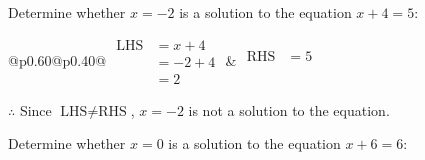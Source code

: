 \documentclass[12pt]{article}
\newcounter{minipagecount}
\begin{document}
\begin{multicols}{2}
\begin{minipage}[t]{0.40\textwidth}
    \noindent Determine whether \(x = -2\) is a solution to the equation \(x + 4 = 5\):
    \vspace{2pt}  %

    \noindent
    \renewcommand{\arraystretch}{1.3} %
    \begin{tabular}{@{}p{0.60\linewidth}@{}p{0.40\linewidth}@{}}
        \(\begin{aligned}
            \text{LHS} &= x + 4 \\
                    &= -2 + 4 \\
                    &= 2 
        \end{aligned}\) &
        \(\begin{aligned}
            \text{RHS} &= 5\\
                    & \\
                    &
        \end{aligned}\)
    \end{tabular}
    \renewcommand{\arraystretch}{1.0} %
    \vspace{2pt}  %

    \noindent \(\therefore\) Since \(\text{LHS} \neq \text{RHS}\), \(x = -2\) is not  a solution to the equation.

\end{minipage}

\vspace*{0.5ex}
\vfill{}
\newpage
\noindent{(\theminipagecount)}\hspace{0.1mm} %
\begin{minipage}[t]{0.40\textwidth} %

    \noindent Determine whether \(x = 0\) is a solution to the equation \(x + 6 = 6\):
    \vspace{2pt}  %


\end{minipage}
\end{multicols}
\end{document}
